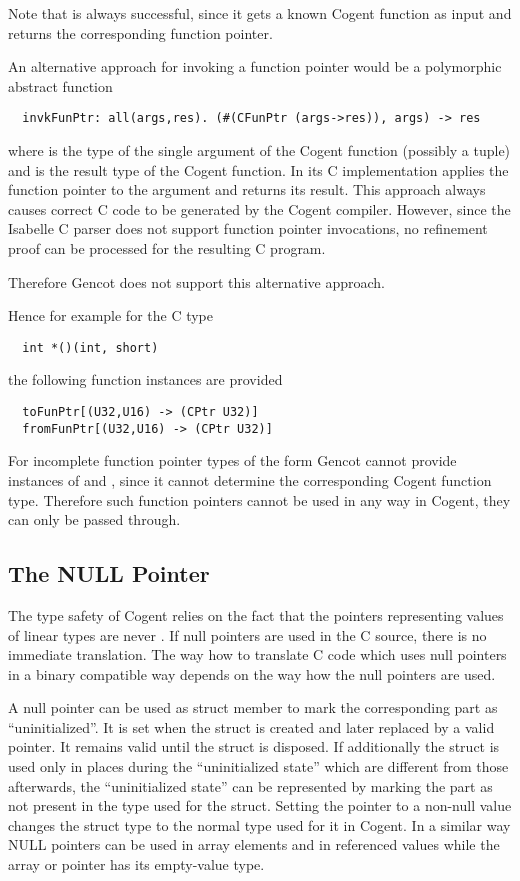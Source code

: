 Note that  is always successful, since it gets a known Cogent function as input and returns 
the corresponding function pointer.

An alternative approach for invoking a function pointer would be a polymorphic abstract function 
\begin{verbatim}
  invkFunPtr: all(args,res). (#(CFunPtr (args->res)), args) -> res
\end{verbatim}
where  is the type of the single argument of the Cogent function (possibly a tuple) and 
is the result type of the Cogent function. In its C implementation  applies the function pointer
to the argument and returns its result. 
This approach always causes correct C code to be generated by the Cogent compiler. However, since the Isabelle
C parser does not support function pointer invocations, no refinement proof can be processed for the resulting
C program.

Therefore Gencot does not support this alternative approach.

Hence for example for the C type
\begin{verbatim}
  int *()(int, short)
\end{verbatim}
the following function instances are provided
\begin{verbatim}
  toFunPtr[(U32,U16) -> (CPtr U32)]
  fromFunPtr[(U32,U16) -> (CPtr U32)]
\end{verbatim}

For incomplete function pointer types of the form  Gencot cannot provide instances of
 and , since it cannot determine the corresponding Cogent function type. Therefore
such function pointers cannot be used in any way in Cogent, they can only be passed through.

\subsection{The NULL Pointer}
\label{design-operations-null}

The type safety of Cogent relies on the fact that the pointers representing values of linear types are never .
If null pointers are used in the C source, there is no immediate translation. The way how to translate C code which uses 
null pointers in a binary compatible way depends on the way how the null pointers are used.

A null pointer can be used as struct member  to mark the corresponding part as ``uninitialized''. 
It is set when the struct is created and later
replaced by a valid pointer. It remains valid until the struct is disposed. If additionally the struct is used only in places
during the ``uninitialized state'' which are different from those afterwards, the ``uninitialized state'' can be represented
by marking the part  as not present in the type used for the struct. Setting the pointer to a non-null value 
changes the struct type to the normal type used for it in Cogent. In a similar way NULL pointers can be used in array
elements and in referenced values while the array or pointer has its empty-value type.


